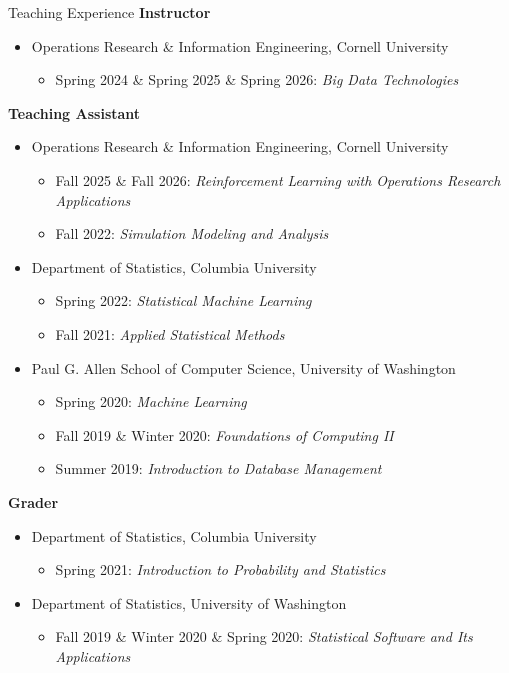 \documentclass{resume} %
\begin{document}
\begin{rSection}{Teaching Experience}
{\bf Instructor}
\begin{itemize}
	\item Operations Research \& Information Engineering, Cornell University
	\begin{itemize}
		\item Spring 2024 \& Spring 2025 \& Spring 2026: {\em Big Data Technologies}
	\end{itemize}
\end{itemize}
{\bf Teaching Assistant}
\begin{itemize}
	\item Operations Research \& Information Engineering, Cornell University
	\begin{itemize}
		\item Fall 2025 \& Fall 2026: {\em Reinforcement Learning with Operations Research Applications}
		\item Fall 2022: {\em Simulation Modeling and Analysis}
	\end{itemize}
	\item Department of Statistics, Columbia University
	\begin{itemize}
		\item Spring 2022: {\em Statistical Machine Learning}
		\item Fall 2021: {\em Applied Statistical Methods}
	\end{itemize}
	\item Paul G. Allen School of Computer Science, University of Washington
	\begin{itemize}
		\item Spring 2020: {\em Machine Learning}
		\item Fall 2019 \& Winter 2020: {\em Foundations of Computing II}
		\item Summer 2019: {\em Introduction to Database Management}
	\end{itemize}
\end{itemize}
{\bf Grader}
\begin{itemize}
	\item Department of Statistics, Columbia University
	\begin{itemize}
		\item Spring 2021: {\em Introduction to Probability and Statistics}
	\end{itemize}
	\item Department of Statistics, University of Washington
	\begin{itemize}
		\item Fall 2019 \& Winter 2020 \& Spring 2020: {\em Statistical Software and Its Applications}
	\end{itemize}
\end{itemize}
\end{rSection}
\end{document}

